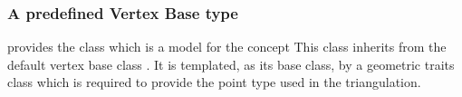 \subsubsection{A predefined Vertex Base type}
\cgal provides the class 
which is a model for the concept 
This class inherits from the default vertex base class
. It is templated,
as its base class, by a geometric traits class 
which is required to provide  the point type
used in the triangulation.